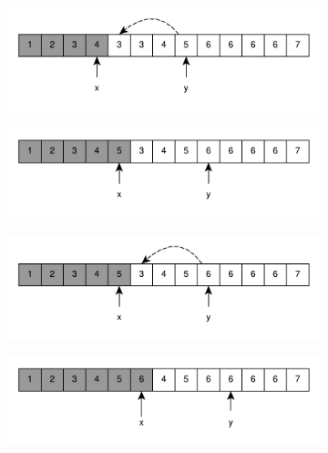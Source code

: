 \begin{figure}
\begin{subfigure}[t]{0.45\textwidth}
		\caption{}
		\label{fig:remove_duplicated_sorted_array_inplace:example1_6}
	 \end{subfigure}
	 \hfill
	 \begin{subfigure}[t]{0.45\textwidth}
		\includegraphics[width=1\linewidth]{sources/remove_duplicated_sorted_array_inplace/images/example1_8}
		\caption{}
		\label{fig:remove_duplicated_sorted_array_inplace:example1_6}
	 \end{subfigure}
	 \hfill
	 \begin{subfigure}[t]{0.45\textwidth}
		\includegraphics[width=1\linewidth]{sources/remove_duplicated_sorted_array_inplace/images/example1_9}
		\caption{}
		\label{fig:remove_duplicated_sorted_array_inplace:example1_6}
	 \end{subfigure}
	 \hfill
	 \begin{subfigure}[t]{0.45\textwidth}
		\includegraphics[width=1\linewidth]{sources/remove_duplicated_sorted_array_inplace/images/example1_10}
		\caption{}
		\label{fig:remove_duplicated_sorted_array_inplace:example1_6}
	 \end{subfigure}
	 \hfill
	 \begin{subfigure}[t]{0.45\textwidth}
		\includegraphics[width=1\linewidth]{sources/remove_duplicated_sorted_array_inplace/images/example1_11}

\end{subfigure}
\end{figure}
